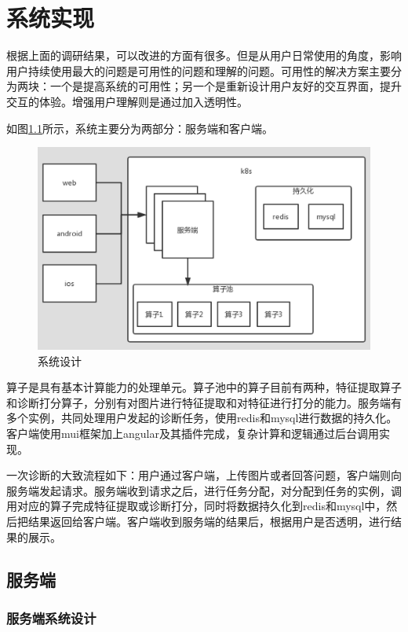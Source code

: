\chapter{系统实现}
根据上面的调研结果，可以改进的方面有很多。但是从用户日常使用的角度，影响用户持续使用最大的问题是可用性的问题和理解的问题。可用性的解决方案主要分为两块：一个是提高系统的可用性；另一个是重新设计用户友好的交互界面，提升交互的体验。增强用户理解则是通过加入透明性。

如图\ref{fig:system}所示，系统主要分为两部分：服务端和客户端。

\begin{figure}
    \centering
    \includegraphics[width=12cm]{images/system.png}
    \caption{系统设计}
    \label{fig:system}
\end{figure}

算子是具有基本计算能力的处理单元。算子池中的算子目前有两种，特征提取算子和诊断打分算子，分别有对图片进行特征提取和对特征进行打分的能力。服务端有多个实例，共同处理用户发起的诊断任务，使用redis和mysql进行数据的持久化。客户端使用mui框架加上angular及其插件完成，复杂计算和逻辑通过后台调用实现。

一次诊断的大致流程如下：用户通过客户端，上传图片或者回答问题，客户端则向服务端发起请求。服务端收到请求之后，进行任务分配，对分配到任务的实例，调用对应的算子完成特征提取或诊断打分，同时将数据持久化到redis和mysql中，然后把结果返回给客户端。客户端收到服务端的结果后，根据用户是否透明，进行结果的展示。




\section{服务端}
\subsection{服务端系统设计}

